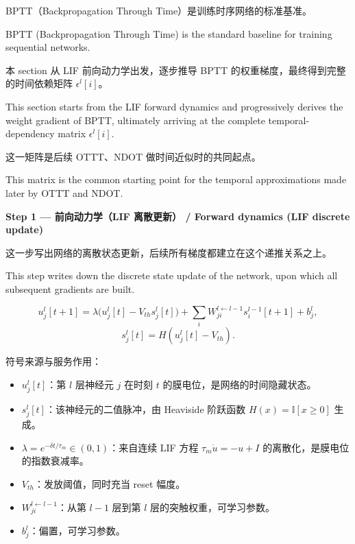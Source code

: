 \documentclass[journal,12pt,onecolumn]{IEEEtran}
\begin{document}
BPTT（Backpropagation Through Time）是训练时序网络的标准基准。

BPTT (Backpropagation Through Time) is the standard baseline for training sequential networks.

本 section 从 LIF 前向动力学出发，逐步推导 BPTT 的权重梯度，最终得到完整的时间依赖矩阵 $\epsilon^l[i]$。

This section starts from the LIF forward dynamics and progressively derives the weight gradient of BPTT, ultimately arriving at the complete temporal-dependency matrix $\epsilon^l[i]$.

这一矩阵是后续 OTTT、NDOT 做时间近似时的共同起点。

This matrix is the common starting point for the temporal approximations made later by OTTT and NDOT.

\medskip\noindent\textbf{Step 1 — 前向动力学（LIF 离散更新） / Forward dynamics (LIF discrete update)}

这一步写出网络的离散状态更新，后续所有梯度都建立在这个递推关系之上。

This step writes down the discrete state update of the network, upon which all subsequent gradients are built.

\begin{equation}
u_j^l[t+1] = \lambda \big( u_j^l[t] - V_{th} s_j^l[t] \big) + \sum_i W_{ji}^{l\leftarrow l-1} s_i^{l-1}[t+1] + b_j^l,
\end{equation}
\begin{equation}
s_j^l[t] = H(u_j^l[t] - V_{th}).
\end{equation}

符号来源与服务作用：
\begin{itemize}[leftmargin=1.5em,itemsep=2pt]
\item $u_j^l[t]$：第 $l$ 层神经元 $j$ 在时刻 $t$ 的膜电位，是网络的时间隐藏状态。
\item $s_j^l[t]$：该神经元的二值脉冲，由 Heaviside 阶跃函数 $H(x)=\mathbb I[x\ge 0]$ 生成。
\item $\lambda=e^{-\delta t/\tau_m}\in(0,1)$：来自连续 LIF 方程 $\tau_m\dot u=-u+I$ 的离散化，是膜电位的指数衰减率。
\item $V_{th}$：发放阈值，同时充当 reset 幅度。
\item $W_{ji}^{l\leftarrow l-1}$：从第 $l-1$ 层到第 $l$ 层的突触权重，可学习参数。
\item $b_j^l$：偏置，可学习参数。
\end{itemize}
\end{document}
